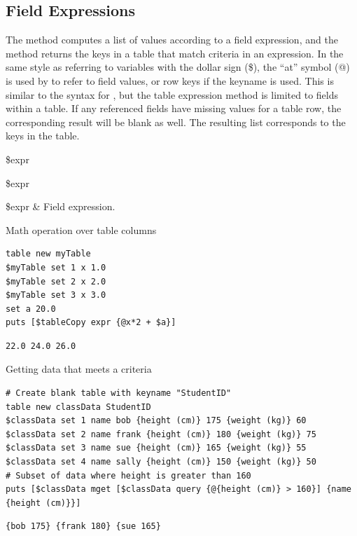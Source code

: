 \subsection{Field Expressions}
The method  computes a list of values according to a field expression, and the method  returns the keys in a table that match criteria in an expression.
In the same style as referring to variables with the dollar sign (\$), the ``at'' symbol (@) is used by  to refer to field values, or row keys if the keyname is used. 
This is similar to the syntax for , but the table expression method is limited to fields within a table.
If any referenced fields have missing values for a table row, the corresponding result will be blank as well. 
The resulting list corresponds to the keys in the table.
\begin{syntax}
 \$expr
\end{syntax}
\begin{syntax}
 \$expr
\end{syntax}
\begin{args}
\$expr & Field expression.
\end{args}
\begin{example}{Math operation over table columns}
\begin{lstlisting}
table new myTable
$myTable set 1 x 1.0 
$myTable set 2 x 2.0
$myTable set 3 x 3.0
set a 20.0
puts [$tableCopy expr {@x*2 + $a}]
\end{lstlisting}
\tcblower
\begin{lstlisting}
22.0 24.0 26.0
\end{lstlisting}
\end{example}
\begin{example}{Getting data that meets a criteria}
\begin{lstlisting}
# Create blank table with keyname "StudentID"
table new classData StudentID
$classData set 1 name bob {height (cm)} 175 {weight (kg)} 60
$classData set 2 name frank {height (cm)} 180 {weight (kg)} 75
$classData set 3 name sue {height (cm)} 165 {weight (kg)} 55
$classData set 4 name sally {height (cm)} 150 {weight (kg)} 50
# Subset of data where height is greater than 160
puts [$classData mget [$classData query {@{height (cm)} > 160}] {name {height (cm)}}]
\end{lstlisting}
\tcblower
\begin{lstlisting}
{bob 175} {frank 180} {sue 165}
\end{lstlisting}
\end{example}

